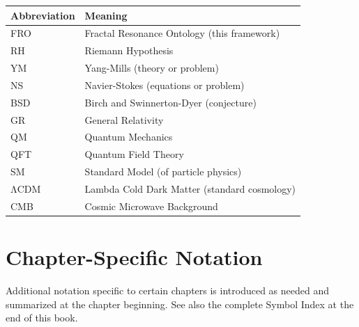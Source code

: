 \begin{center}
\begin{tabular}{ll}
\toprule
\textbf{Abbreviation} & \textbf{Meaning} \\
\midrule
FRO & Fractal Resonance Ontology (this framework) \\
RH & Riemann Hypothesis \\
YM & Yang-Mills (theory or problem) \\
NS & Navier-Stokes (equations or problem) \\
BSD & Birch and Swinnerton-Dyer (conjecture) \\
GR & General Relativity \\
QM & Quantum Mechanics \\
QFT & Quantum Field Theory \\
SM & Standard Model (of particle physics) \\
ΛCDM & Lambda Cold Dark Matter (standard cosmology) \\
CMB & Cosmic Microwave Background \\
\bottomrule
\end{tabular}
\end{center}

\section*{Chapter-Specific Notation}

Additional notation specific to certain chapters is introduced as needed and summarized at the chapter beginning. See also the complete Symbol Index at the end of this book.
